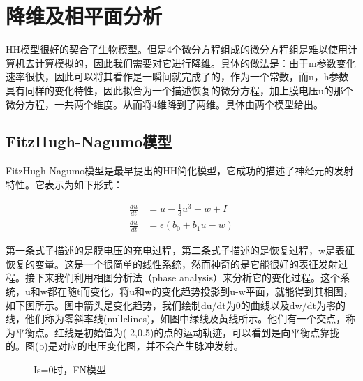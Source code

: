 \documentclass[12pt, a4paper, oneside]{ctexbook}
\begin{document}
\chapter{降维及相平面分析}

HH模型很好的契合了生物模型。但是4个微分方程组成的微分方程组是难以使用计算机去计算模拟的，因此我们需要对它进行降维。具体的做法是：由于m参数变化速率很快，因此可以将其看作是一瞬间就完成了的，作为一个常数，而n，h参数具有同样的变化特性，因此拟合为一个描述恢复的微分方程，加上膜电压u的那个微分方程，一共两个维度。从而将4维降到了两维。具体由两个模型给出。

\section{FitzHugh-Nagumo模型}




FitzHugh-Nagumo模型是最早提出的HH简化模型，它成功的描述了神经元的发射特性。它表示为如下形式：

\begin{equation}
    \begin{aligned}
        \frac{du}{dt}&=u-\frac{1}{3}u^3-w+I\\
        \frac{dw}{dt}&=\epsilon(b_0+b_1 u-w)
    \end{aligned}
\end{equation}

第一条式子描述的是膜电压的充电过程，第二条式子描述的是恢复过程，w是表征恢复的变量。这是一个很简单的线性系统，然而神奇的是它能很好的表征发射过程。接下来我们利用相图分析法（phase analysis）来分析它的变化过程。这个系统，u和w都在随t而变化，将u和w的变化趋势投影到u-w平面，就能得到其相图，如下图所示。图中箭头是变化趋势，我们绘制du/dt为0的曲线以及dw/dt为零的线，他们称为零斜率线(nullclines)，如图中绿线及黄线所示。他们有一个交点，称为平衡点。红线是初始值为(-2,0.5)的点的运动轨迹，可以看到是向平衡点靠拢的。图(b)是对应的电压变化图，并不会产生脉冲发射。

\begin{figure}[H]
    \centering
    \caption{Is=0时，FN模型}
\end{figure}
\end{document}
